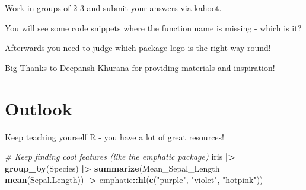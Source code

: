 \documentclass[
]{book}
\newenvironment{Shaded}{\begin{snugshade}}{\end{snugshade}}
\newcommand{\AttributeTok}[1]{\textcolor[rgb]{0.13,0.29,0.53}{#1}}
\newcommand{\CommentTok}[1]{\textcolor[rgb]{0.56,0.35,0.01}{\textit{#1}}}
\newcommand{\FunctionTok}[1]{\textcolor[rgb]{0.13,0.29,0.53}{\textbf{#1}}}
\newcommand{\NormalTok}[1]{#1}
\newcommand{\SpecialCharTok}[1]{\textcolor[rgb]{0.81,0.36,0.00}{\textbf{#1}}}
\newcommand{\StringTok}[1]{\textcolor[rgb]{0.31,0.60,0.02}{#1}}
\begin{document}
Work in groups of 2-3 and submit your answers via kahoot.

You will see some code snippets where the function name is missing - which is it?

Afterwards you need to judge which package logo is the right way round!

Big Thanks to Deepansh Khurana for providing materials and inspiration!

\section{Outlook}\label{outlook}

Keep teaching yourself R - you have a lot of great resources!

\begin{Shaded}
\begin{Highlighting}[]
\CommentTok{\# Keep finding cool features (like the emphatic package)}
\NormalTok{iris }\SpecialCharTok{|\textgreater{}} 
  \FunctionTok{group\_by}\NormalTok{(Species) }\SpecialCharTok{|\textgreater{}} 
  \FunctionTok{summarize}\NormalTok{(}\AttributeTok{Mean\_Sepal\_Length =} \FunctionTok{mean}\NormalTok{(Sepal.Length)) }\SpecialCharTok{|\textgreater{}} 
\NormalTok{  emphatic}\SpecialCharTok{::}\FunctionTok{hl}\NormalTok{(}\FunctionTok{c}\NormalTok{(}\StringTok{"purple"}\NormalTok{, }\StringTok{"violet"}\NormalTok{, }\StringTok{"hotpink"}\NormalTok{))}
\end{Highlighting}
\end{Shaded}

\begingroup
\setlength{\fboxsep}{0pt}
\end{document}
